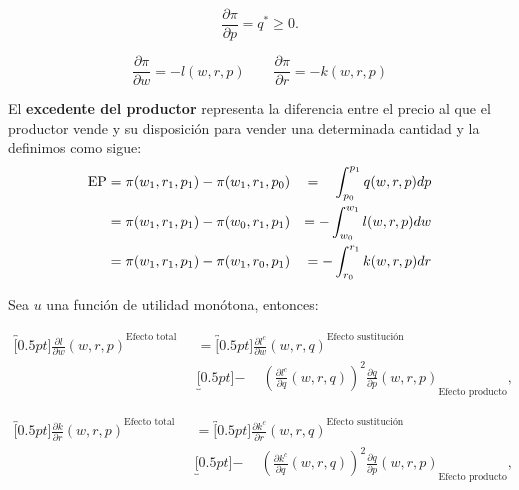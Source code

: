 \documentclass[8pt,a4paper]{extarticle}
\begin{document}
\begin{multicols}{3}
\begin{boxlemma}
	\[
	\frac{\partial \pi}{\partial p} = q^* \ge 0
	.\] 
\end{boxlemma}

\begin{boxcor}
	\[
		\frac{\partial \pi}{\partial w} = - l (w, r, p) \qquad \frac{\partial \pi}{\partial r} = - k (w, r, p)
\]
\end{boxcor}

\begin{boxdef}
	El \textbf{excedente del productor} representa la diferencia entre el precio al que el productor vende y su disposición para vender una determinada cantidad y la definimos como sigue:
\begin{equation*}
	\begin{aligned}
		\text{\normalfont EP} &= \pi(w_1, r_1, p_1) - \pi(w_1, r_1, p_0) &= \phantom{-} \int_{p_0}^{p_1} q(w,r,p)dp \\
							  &= \pi(w_1, r_1, p_1) - \pi(w_0, r_1, p_1) &= - \int_{w_0}^{w_1} l(w,r,p)dw \\
							  &= \pi(w_1, r_1, p_1) - \pi(w_1, r_0, p_1) &= - \int_{r_0}^{r_1} k(w,r,p)dr
	\end{aligned}
\end{equation*}
\end{boxdef}

\newpage

\sectionbreak

\begin{boxtheo}
	Sea $u$ una función de utilidad monótona, entonces:
	
	\begin{equation*}
	\begin{aligned}
		\overbracket[0.5pt]{\frac{\partial l}{\partial w} (w, r, p)}^{\text{Efecto total}} \quad &= \overbracket[0.5pt]{\frac{\partial l^c}{\partial w} (w, r, q)}^{\text{Efecto sustitución}} \\
																						& \underbracket[0.5pt]{ - \quad\ \left( \frac{\partial l^c}{\partial q} (w,r,q) \right)^2 \frac{\partial q}{\partial p} (w, r, p)}_{\text{Efecto producto}},
	\end{aligned}
	\end{equation*}	

	\begin{equation*}
	\begin{aligned}
		\overbracket[0.5pt]{\frac{\partial k}{\partial r} (w, r, p)}^{\text{Efecto total}} \quad &= \overbracket[0.5pt]{\frac{\partial k^c}{\partial r} (w, r, q)}^{\text{Efecto sustitución}} \\
																						& \underbracket[0.5pt]{ - \quad\ \left( \frac{\partial k^c}{\partial q} (w,r,q) \right)^2 \frac{\partial q}{\partial p} (w, r, p)}_{\text{Efecto producto}},
	\end{aligned}
	\end{equation*}	
	

\end{boxtheo}
\end{multicols}
\end{document}
